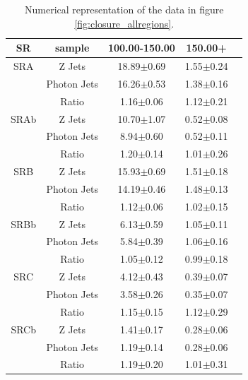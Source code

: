       \begin{table}[!h]
        \scriptsize
        \begin{center}
          \caption{\label{tab:template_systematics} 
            Numerical representation of the data in figure \ref{fig:closure_allregions}.
          }
          \begin{tabular}{c|c|ccc}\hline
            SR & sample &100.00-150.00&150.00+\\
            \hline
            SRA & Z Jets  & 18.89$\pm$0.69 & 1.55$\pm$0.24\\
            & Photon Jets & 16.26$\pm$0.53 & 1.38$\pm$0.16\\
            & Ratio       & 1.16$\pm$0.06 & 1.12$\pm$0.21\\
            \hline

            SRAb & Z Jets & 10.70$\pm$1.07 & 0.52$\pm$0.08\\
            & Photon Jets & 8.94$\pm$0.60 & 0.52$\pm$0.11\\
            & Ratio       & 1.20$\pm$0.14 & 1.01$\pm$0.26\\
            \hline

            SRB & Z Jets  & 15.93$\pm$0.69 & 1.51$\pm$0.18\\
            & Photon Jets & 14.19$\pm$0.46 & 1.48$\pm$0.13\\
            & Ratio       & 1.12$\pm$0.06 & 1.02$\pm$0.15\\
            \hline

            SRBb & Z Jets & 6.13$\pm$0.59 & 1.05$\pm$0.11\\
            & Photon Jets & 5.84$\pm$0.39 & 1.06$\pm$0.16\\
            & Ratio       & 1.05$\pm$0.12 & 0.99$\pm$0.18\\
            \hline

            SRC & Z Jets  & 4.12$\pm$0.43 & 0.39$\pm$0.07\\
            & Photon Jets & 3.58$\pm$0.26 & 0.35$\pm$0.07\\
            & Ratio       & 1.15$\pm$0.15 & 1.12$\pm$0.29\\
            \hline

            SRCb & Z Jets & 1.41$\pm$0.17 & 0.28$\pm$0.06\\
            & Photon Jets & 1.19$\pm$0.14 & 0.28$\pm$0.06\\
            & Ratio       & 1.19$\pm$0.20 & 1.01$\pm$0.31\\
            \hline


\end{tabular}
\end{center}
\end{table}
